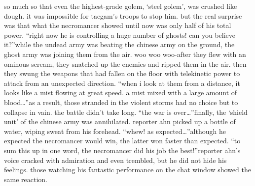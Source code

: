 so much so that even the highest-grade golem, ‘steel golem’, was crushed like dough.
 it was impossible for taegam’s troops to stop him.
but the real surprise was that what the necromancer showed until now was only half of his total power.
“right now he is controlling a huge number of ghosts! can you believe it?”while the undead army was beating the chinese army on the ground, the ghost army was joining them from the air.
woo woo woo-after they flew with an ominous scream, they snatched up the enemies and ripped them in the air.
 then they swung the weapons that had fallen on the floor with telekinetic power to attack from an unexpected direction.
“when i look at them from a distance, it looks like a mist flowing at great speed.
 a mist mixed with a large amount of blood…”as a result, those stranded in the violent storms had no choice but to collapse in vain.
the battle didn’t take long.
“the war is over…”finally, the ‘shield unit’ of the chinese army was annihilated.
reporter ahn picked up a bottle of water, wiping sweat from his forehead.
“whew! as expected…”although he expected the necromancer would win, the latter won faster than expected.
“to sum this up in one word, the necromancer did his job the best!”reporter ahn’s voice cracked with admiration and even trembled, but he did not hide his feelings.
 those watching his fantastic performance on the chat window showed the same reaction.


 